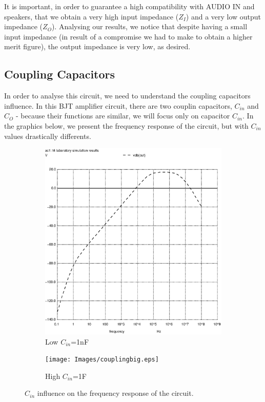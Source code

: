 It is important, in order to guarantee a high compatibility with AUDIO IN and speakers, that we obtain a very high input impedance ($Z_I$) and a very low output impedance ($Z_O$). Analysing our results, we notice that despite having a small input impedance (in result of a compromise we had to make to obtain a higher merit figure), the output impedance is very low, as desired.




\subsection{Coupling Capacitors}
In order to analyse this circuit, we need to understand the coupling capacitors influence. In this BJT amplifier circuit, there are two couplin capacitors, $C_{in}$ and $C_O$ - because their functions are similar, we will focus only on capacitor $C_{in}$. In the graphics below, we present the frequency response of the circuit, but with $C_{in}$ values drastically differents.

\begin{figure}[h]
\centering
\begin{subfigure}{.5\textwidth}
    \centering
    \includegraphics[scale=0.33]{Images/couplingsmall.ps}
    \caption{Low $C_{in}$=1nF}
\end{subfigure}%
\begin{subfigure}{.5\textwidth}
    \centering
    \texttt{[image: Images/couplingbig.eps]}
    \caption{High $C_{in}$=1F}
\end{subfigure}
\caption{$C_{in}$ influence on the frequency response of the circuit.}
\label{fig_coupling}
\end{figure}

